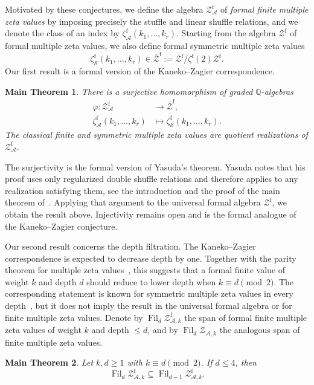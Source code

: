 \documentclass[12pt]{amsart}
\numberwithin{equation}{section}
\theoremstyle{plain}
\newtheorem{mainthm}{Main Theorem}
\newcommand{\QQ}{\mathbb{Q}}
\DeclareMathOperator{\Fil}{Fil}
\newcommand{\Zf}{{\mathcal Z^{\mathrm f}}}
\newcommand{\ZAf}{{\mathcal Z_{\mathcal A}^{\mathrm f}}}
\newcommand{\ZAw}[1]{{\mathcal Z_{\mathcal A,#1}}}
\newcommand{\ZAfw}[1]{{\mathcal Z_{\mathcal A,#1}^{\mathrm f}}}
\newcommand{\Zbarf}{{\overline{\mathcal Z}^{\mathrm f}}}
\newcommand{\zf}[1]{\zeta^{\mathrm f}(#1)}
\newcommand{\zaf}[1]{\zeta_{\mathcal A}^{\mathrm f}(#1)}
\newcommand{\zsf}[1]{\zeta_{\mathcal S}^{\mathrm f}(#1)}
\begin{document}
Motivated by these conjectures, we define the algebra
$\ZAf$ of \emph{formal finite multiple zeta values} by imposing precisely the
stuffle and linear shuffle relations, and we denote the class of an index by
$\zaf{k_1,\ldots,k_r}$. Starting from the algebra $\Zf$ of formal multiple
zeta values, we also define formal symmetric multiple zeta values
\[
 \zsf{k_1,\ldots,k_r}\in
 \Zbarf:=\Zf/\zf{2}\Zf.
\]
Our first result is a formal version of the Kaneko--Zagier correspondence.

\begin{mainthm}\label{main:formal-kz}
There is a surjective homomorphism of graded $\QQ$-algebras
\[
 \begin{aligned}
 \varphi:\ZAf&\longrightarrow\Zbarf,\\
 \zaf{k_1,\ldots,k_r}&\longmapsto\zsf{k_1,\ldots,k_r}.
 \end{aligned}
\]
The classical finite and symmetric multiple zeta values are quotient
realizations of $\ZAf$.
\end{mainthm}

The surjectivity is the formal version of Yasuda's theorem. Yasuda notes that
his proof uses only regularized double shuffle relations and therefore applies
to any realization satisfying them, see the introduction and the proof of the
main theorem of~\cite{Yasuda}. Applying
that argument to the universal formal algebra $\Zf$, we obtain the result above.
Injectivity remains open and is the formal analogue of the Kaneko--Zagier
conjecture.

Our second result concerns the depth filtration. The Kaneko--Zagier
correspondence is expected to decrease depth by one. Together with the parity
theorem for multiple zeta values~\cite{Tsumura,Panzer}, this suggests that a
formal finite value of weight $k$ and depth $d$ should reduce to lower depth
when $k\equiv d\pmod2$. The corresponding statement is known for symmetric
multiple zeta values in every depth~\cite[Corollary to Theorem~4]{KZ}, but it
does not imply the result in the universal formal algebra or for finite
multiple zeta values. Denote by $\Fil_d\ZAfw{k}$ the span of formal finite multiple zeta values of
weight $k$ and depth $\leq d$, and by $\Fil_d\ZAw{k}$ the analogous span of
finite multiple zeta values.

\begin{mainthm}\label{main:parity}
Let $k,d\geq1$ with $k\equiv d\pmod2$. If $d\leq4$, then
\[
 \Fil_d\ZAfw{k}\subseteq\Fil_{d-1}\ZAfw{k}.
\]
\end{mainthm}
\end{document}

